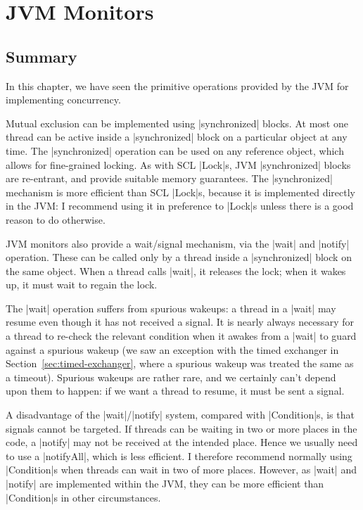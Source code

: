\chapter{JVM Monitors} 
\label{chap:JVMMonitors}



\section{Summary}

In this chapter, we have seen the primitive operations provided by the JVM for
implementing concurrency.  

Mutual exclusion can be implemented using |synchronized| blocks.  At most one
thread can be active inside a |synchronized| block on a particular object at
any time.  The |synchronized| operation can be used on any reference object,
which allows for fine-grained locking.  As with SCL |Lock|s, JVM
|synchronized| blocks are re-entrant, and provide suitable memory guarantees.
The |synchronized| mechanism is more efficient than SCL |Lock|s, because it is
implemented directly in the JVM: I recommend using it in preference to |Lock|s
unless there is a good reason to do otherwise.  

JVM monitors also provide a wait/signal mechanism, via the |wait| and |notify|
operation.  These can be called only by a thread inside a |synchronized| block
on the same object.  When a thread calls |wait|, it releases the lock; when it
wakes up, it must wait to regain the lock.  

The |wait| operation suffers from spurious wakeups: a thread in a |wait| may
resume even though it has not received a signal.  It is nearly always
necessary for a thread to re-check the relevant condition when it awakes from
a |wait| to guard against a spurious wakeup (we saw an exception with the
timed exchanger in Section~\ref{sec:timed-exchanger}, where a spurious wakeup
was treated the same as a timeout).  Spurious wakeups are rather rare, and we
certainly can't depend upon them to happen: if we want a thread to resume, it
must be sent a signal.

A disadvantage of the |wait|/|notify| system, compared with |Condition|s, is
that signals cannot be targeted.  If threads can be waiting in two or more
places in the code, a |notify| may not be received at the intended place.
Hence we usually need to use a |notifyAll|, which is less efficient.  I
therefore recommend normally using |Condition|s when threads can wait in two
of more places.  However, as |wait| and |notify| are implemented within the
JVM, they can be more efficient than |Condition|s in other circumstances.


